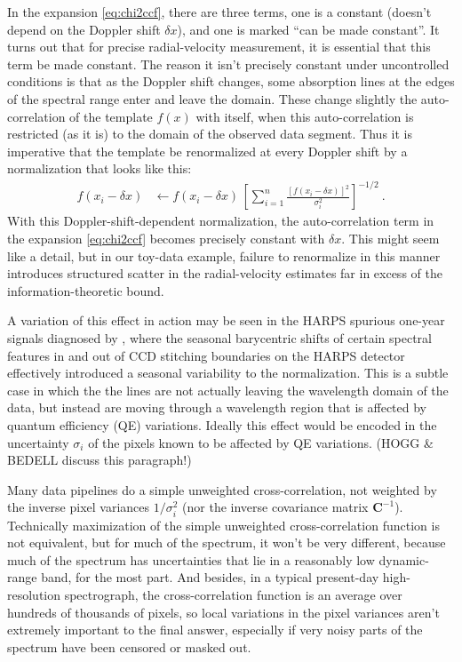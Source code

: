 \documentclass[modern]{aastex631}
\newcommand{\lao}[1]{\boldsymbol{#1}}
\newcommand{\vC}{\lao{C}}
\begin{document}
In the expansion \eqref{eq:chi2ccf}, there are three terms, one is a constant (doesn't depend on the Doppler shift $\delta x$), and one is marked ``can be made constant''.
It turns out that for precise radial-velocity measurement, it is essential that this term be made constant.
The reason it isn't precisely constant under uncontrolled conditions is that as the Doppler shift changes, some absorption lines at the edges of the spectral range enter and leave the domain.
These change slightly the auto-correlation of the template $f(x)$ with itself, when this auto-correlation is restricted (as it is) to the domain of the observed data segment.
Thus it is imperative that the template be renormalized at every Doppler shift by a normalization that looks like this:
\begin{align}
    f(x_i-\delta x) &\leftarrow f(x_i-\delta x)\,\left[\sum_{i=1}^n \frac{[f(x_i-\delta x)]^2}{\sigma_i^2}\right]^{-1/2} ~.
\end{align}
With this Doppler-shift-dependent normalization, the auto-correlation term in the expansion \eqref{eq:chi2ccf} becomes precisely constant with $\delta x$.
This might seem like a detail, but in our toy-data example, failure to renormalize in this manner introduces structured scatter in the radial-velocity estimates far in excess of the information-theoretic bound. 

A variation of this effect in action may be seen in the HARPS spurious one-year signals diagnosed by \citet{Dumusque2015}, where the seasonal barycentric shifts of certain spectral features in and out of CCD stitching boundaries on the HARPS detector effectively introduced a seasonal variability to the normalization. 
This is a subtle case in which the the lines are not actually leaving the wavelength domain of the data, but instead are moving through a wavelength region that is affected by quantum efficiency (QE) variations. 
Ideally this effect would be encoded in the uncertainty $\sigma_i$ of the pixels known to be affected by QE variations.
(HOGG \& BEDELL discuss this paragraph!)

Many data pipelines do a simple unweighted cross-correlation, not weighted by the inverse pixel variances $1/\sigma_i^2$ (nor the inverse covariance matrix $\vC^{-1}$).
Technically maximization of the simple unweighted cross-correlation function is not equivalent, but for much of the spectrum, it won't be very different, because much of the spectrum has uncertainties that lie in a reasonably low dynamic-range band, for the most part.
And besides, in a typical present-day high-resolution spectrograph, the cross-correlation function is an average over hundreds of thousands of pixels, so local variations in the pixel variances aren't extremely important to the final answer, especially if very noisy parts of the spectrum have been censored or masked out.
\end{document}
